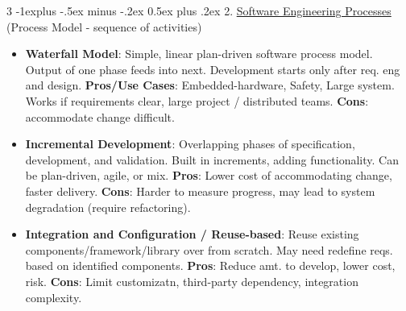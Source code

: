 \documentclass[a4paper, 10pt, landscape]{article}
\makeatletter
\renewcommand{\subsection}{\@startsection{subsection}{2}{0mm}%
                                {-1explus -.5ex minus -.2ex}%
                                {0.5ex plus .2ex}%
                                {\normalfont\normalsize\bfseries}}
\makeatother
\begin{document}
\begin{multicols*}{3}
\subsection{2. \underline{Software Engineering Processes} {\scriptsize (Process Model - sequence of activities)}}
\begin{itemize}
	\item \textbf{Waterfall Model}:  Simple, linear plan-driven software process model. Output of one phase feeds into next. Development starts only after req. eng and design. \textbf{Pros/Use Cases}: Embedded-hardware, Safety, Large system. Works if requirements clear, large project / distributed teams. \textbf{Cons}: accommodate change difficult.
	\item \textbf{Incremental Development}: Overlapping phases of specification, development, and validation. Built in increments, adding functionality. Can be plan-driven, agile, or mix. \textbf{Pros}: Lower cost of accommodating change, faster delivery. \textbf{Cons}: Harder to measure progress, may lead to system degradation (require refactoring). 
	\item \textbf{Integration and Configuration / Reuse-based}: Reuse existing components/framework/library over from scratch. May need redefine reqs. based on identified components. \textbf{Pros}: Reduce amt. to develop, lower cost, risk. \textbf{Cons}: Limit customizatn, third-party dependency, integration complexity.  
\end{itemize}



\end{multicols*}
\end{document}
